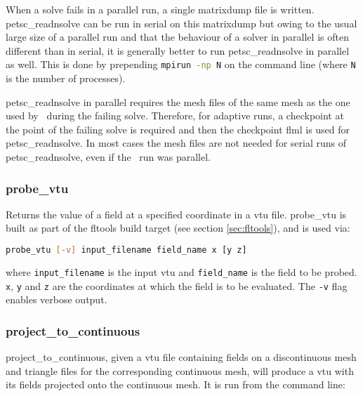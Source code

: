When a solve fails in a parallel run, a single matrixdump file is written. petsc\_readnsolve can be run in serial on this matrixdump but owing to the usual large size of a parallel run and that the behaviour of a solver in parallel is often different than in serial, it is generally better to run petsc\_readnsolve in parallel as well. This is done by prepending \lstinline[language = Bash]+mpirun -np N+ on the command line (where \lstinline[language = Bash]+N+ is the number of processes).

petsc\_readnsolve in parallel requires the mesh files of the same mesh as the one used by \fluidity\ during the failing solve. Therefore, for adaptive runs, a checkpoint at the point of the failing solve is required and then the checkpoint flml is used for petsc\_readnsolve. In most cases the mesh files are not needed for serial runs of petsc\_readnsolve, even if the \fluidity\ run was parallel.


\subsubsection{probe\_vtu}
\label{sec:probe_vtu}

Returns the value of a field at a specified coordinate in a vtu file.
probe\_vtu is built as part of the fltools
build target (see section \ref{sec:fltools}), and is used via:

\begin{lstlisting}[language = Bash]
probe_vtu [-v] input_filename field_name x [y z]
\end{lstlisting}

where \lstinline[language = Bash]+input_filename+ is the input vtu and
\lstinline[language = Bash]+field_name+ is the field to be probed. 
\lstinline[language = Bash]+x+, \lstinline[language = Bash]+y+ and
\lstinline[language = Bash]+z+ are the coordinates at which the field is to
be evaluated. The \lstinline[language = Bash]+-v+ flag enables verbose output.


\subsubsection{project\_to\_continuous}
\label{sec:project_to_continuous}
project\_to\_continuous, given a vtu file containing fields on a discontinuous mesh and triangle files for the corresponding continuous mesh, will produce a vtu with its fields projected onto the continuous mesh. It is run from the command line:

